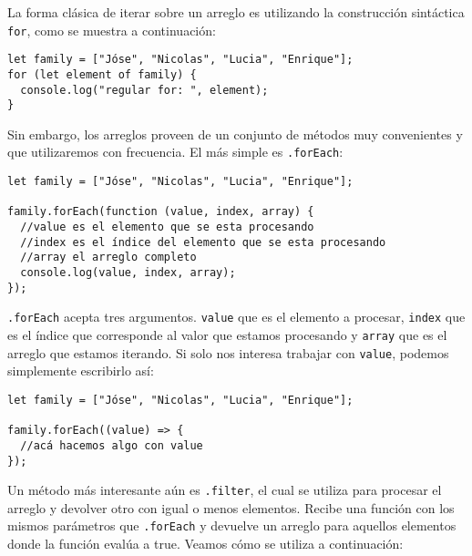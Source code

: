 \documentclass[a4paper, oneside, titlepage, 12pt]{paper}
\begin{document}
La forma clásica de iterar sobre un arreglo es utilizando la construcción sintáctica \texttt{for}, como se muestra a continuación: 

\begin{verbatim}
let family = ["Jóse", "Nicolas", "Lucia", "Enrique"];
for (let element of family) {
  console.log("regular for: ", element);
}
\end{verbatim}
               
Sin embargo, los arreglos proveen de un conjunto de métodos muy convenientes y que utilizaremos con frecuencia. El más simple es \texttt{.forEach}:              
\begin{verbatim}
let family = ["Jóse", "Nicolas", "Lucia", "Enrique"];

family.forEach(function (value, index, array) {
  //value es el elemento que se esta procesando
  //index es el índice del elemento que se esta procesando
  //array el arreglo completo
  console.log(value, index, array);
});
\end{verbatim}

\texttt{.forEach} acepta tres argumentos. \texttt{value} que es el elemento a procesar, \texttt{index} que es el índice que corresponde al valor que estamos procesando y \texttt{array} que es el arreglo que estamos iterando. Si solo nos interesa trabajar con \texttt{value}, podemos simplemente escribirlo así:

\begin{verbatim}
let family = ["Jóse", "Nicolas", "Lucia", "Enrique"];

family.forEach((value) => {
  //acá hacemos algo con value	
});
\end{verbatim}

Un método más interesante aún es \texttt{.filter}, el cual se utiliza para procesar el arreglo y devolver otro con igual o menos elementos. Recibe una función con los mismos parámetros que \texttt{.forEach} y devuelve un arreglo para aquellos elementos donde la función evalúa a true. Veamos cómo se utiliza a continuación:
\end{document}
